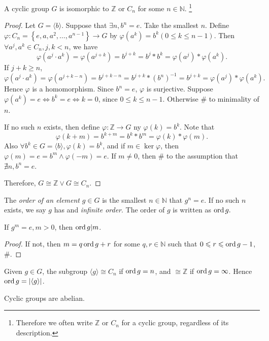 \documentclass[a4paper]{article}
\begin{document}
\begin{theorem}\label{thm:cyclic group isom}
  A cyclic group $G$ is isomorphic to $ \mathbb{Z}  $ or $ C_n $ for
  some $ n\in \mathbb{N} $.
  \footnote{Therefore we often write $ \mathbb{Z}  $ or $ C_n $ for a
  cyclic group, regardless of its description.}
\end{theorem}
\begin{proof}
  Let $ G= \langle b \rangle  $. Suppose that $ \exists n, b^n=e $.
  Take the smallest $n$. Define $ \varphi: C_n = \left\{
  e,a,a^2,\dots,a^{n-1}\right\}\to G $ by $ \varphi(a^k)=b^k(0\le
  k\le n-1) $. Then $ \forall a^j,a^k\in C_n, j,k<n $, we have
  \[
    \varphi(a^j\cdot a^k)=\varphi(a^{j+k})=b^{j+k}=
    b^j*b^k=\varphi(a^j)*\varphi(a^k)
  .\]
  If $ j+k \ge n $,
  \[
    \varphi(a^j\cdot
    a^k)=\varphi(a^{j+k-n})=b^{j+k-n}=b^{j+k}*(b^{n})^{-1}=b^{j+k}=\varphi(a^j)*\varphi(a^k)
  .\]
  Hence $ \varphi $ is a homomorphism. Since $ b^n=e $, $ \varphi $
  is surjective. Suppose $ \varphi(a^k)=e \Leftrightarrow b^k=e
  \Leftrightarrow k=0 $, since $ 0\le k\le n-1 $. Otherwise \# to
  minimality of $n$.

  If no such $ n $ exists, then define $ \varphi: \mathbb{Z} \to G $
  ny $ \varphi(k)=b^k $. Note that
  \[
    \varphi(k+m)=b^{k+m}=b^k*b^m=\varphi(k)*\varphi(m)
  .\]
  Also $ \forall b^k\in G=\langle b \rangle, \varphi(k)=b^k $, and if
  $ m\in \ker \varphi $, then $ \varphi(m)=e=b^m \land \varphi(-m)=e
  $. If $ m\neq 0 $, then \# to the assumption that $ \nexists n, b^n=e $.

  Therefore, $ G \cong \mathbb{Z} \lor G \cong C_n $.
\end{proof}
\begin{definition}
  The \textit{order of an element} $ g\in G $ is the smallest $ n\in
  \mathbb{N}  $ that $ g^n=e $. If no such $n$ exists, we say $g$ has
  and \textit{infinite order}. The order of $g$ is written as $ \operatorname{ord} g. $
\end{definition}
\begin{proposition}\label{prop:div_order}
  If $ g^m=e ,m>0$, then $ \operatorname{ord} g|m $.
\end{proposition}
\begin{proof}
  If not, then $ m=q\operatorname{ord} g +r$ for some $ q,r\in \mathbb{N}  $ such
  that $ 0\leqslant r\leqslant \operatorname{ord} g-1 $, \#.
\end{proof}
\begin{remark}
  Given $ g\in G $, the subgroup $ \langle g \rangle \cong C_n $ if $
  \operatorname{ord} g=n $, and $ \cong \mathbb{Z}  $ if $ \operatorname{ord} g=\infty $. Hence $
  \operatorname{ord} g=|\langle g \rangle | $.
\end{remark}
\begin{proposition}\label{prop:cyclic_abelian}
  Cyclic groups are abelian.
\end{proposition}
\end{document}
